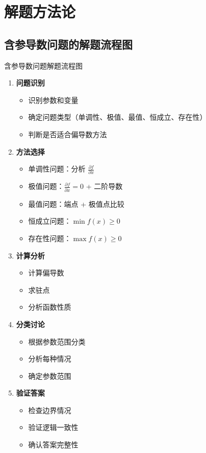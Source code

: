 \documentclass[a4paper,11pt]{ctexart}
\newcommand{\partialder}[2]{\frac{\partial #1}{\partial #2}}
\theoremstyle{definition}
\theoremstyle{remark}
\begin{document}
\section{解题方法论}

\subsection{含参导数问题的解题流程图}

\begin{methodbox}{含参导数问题解题流程图}
\begin{enumerate}
    \item \textbf{问题识别}
    \begin{itemize}
        \item 识别参数和变量
        \item 确定问题类型（单调性、极值、最值、恒成立、存在性）
        \item 判断是否适合偏导数方法
    \end{itemize}
    \item \textbf{方法选择}
    \begin{itemize}
        \item 单调性问题：分析 $\partialder{f}{x}$
        \item 极值问题：$\partialder{f}{x} = 0$ + 二阶导数
        \item 最值问题：端点 + 极值点比较
        \item 恒成立问题：$\min f(x) \geq 0$
        \item 存在性问题：$\max f(x) \geq 0$
    \end{itemize}
    \item \textbf{计算分析}
    \begin{itemize}
        \item 计算偏导数
        \item 求驻点
        \item 分析函数性质
    \end{itemize}
    \item \textbf{分类讨论}
    \begin{itemize}
        \item 根据参数范围分类
        \item 分析每种情况
        \item 确定参数范围
    \end{itemize}
    \item \textbf{验证答案}
    \begin{itemize}
        \item 检查边界情况
        \item 验证逻辑一致性
        \item 确认答案完整性
    \end{itemize}
\end{enumerate}
\end{methodbox}
\end{document}

